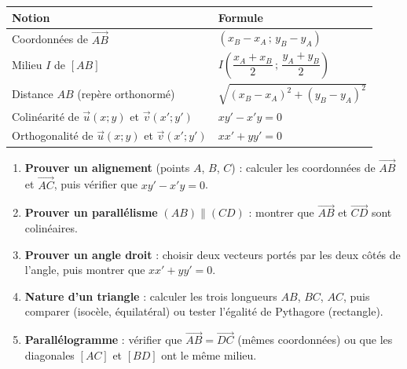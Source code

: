 \documentclass[11pt]{article}
\begin{document}
\begin{aretenir}
\begin{center}
\begin{tabularx}{\linewidth}{|l|X|}
\hline
\rowcolor{popblueL} \textbf{Notion} & \textbf{Formule} \\
\hline
Coordonnées de $\overrightarrow{AB}$ & $(x_B-x_A\,;\,y_B-y_A)$ \\
\hline
Milieu $I$ de $[AB]$ & $I\left(\dfrac{x_A+x_B}{2}\,;\,\dfrac{y_A+y_B}{2}\right)$ \\
\hline
Distance $AB$ (repère orthonormé) & $\sqrt{(x_B-x_A)^2+(y_B-y_A)^2}$ \\
\hline
Colinéarité de $\vec{u}(x;y)$ et $\vec{v}(x';y')$ & $xy'-x'y=0$ \\
\hline
Orthogonalité de $\vec{u}(x;y)$ et $\vec{v}(x';y')$ & $xx'+yy'=0$ \\
\hline
\end{tabularx}
\end{center}
\end{aretenir}

\begin{methode}
\begin{enumerate}
  \item \textbf{Prouver un alignement} (points $A$, $B$, $C$) : calculer les coordonnées de $\overrightarrow{AB}$ et $\overrightarrow{AC}$, puis vérifier que $xy'-x'y=0$.
  \item \textbf{Prouver un parallélisme} $(AB)\parallel(CD)$ : montrer que $\overrightarrow{AB}$ et $\overrightarrow{CD}$ sont colinéaires.
  \item \textbf{Prouver un angle droit} : choisir deux vecteurs portés par les deux côtés de l'angle, puis montrer que $xx'+yy'=0$.
  \item \textbf{Nature d'un triangle} : calculer les trois longueurs $AB$, $BC$, $AC$, puis comparer (isocèle, équilatéral) ou tester l'égalité de Pythagore (rectangle).
  \item \textbf{Parallélogramme} : vérifier que $\overrightarrow{AB}=\overrightarrow{DC}$ (mêmes coordonnées) ou que les diagonales $[AC]$ et $[BD]$ ont le même milieu.
\end{enumerate}
\end{methode}
\end{document}
